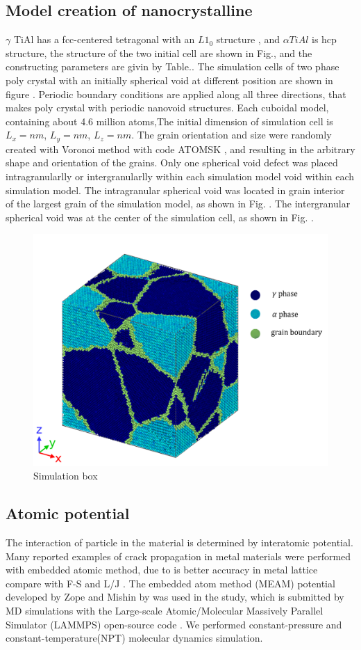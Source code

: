 \documentclass[final,5p,times,twocolumn]{elsarticle}
\begin{document}
\subsection{Model creation of nanocrystalline}
$\gamma $ TiAl has a fcc-centered tetragonal with an $L1_0$ structure \cite{}, and $\alpha TiAl$ is hcp structure, the structure of the two initial cell are shown in Fig.\cite{}, and the constructing parameters are givin by Table.\cite{}. The simulation cells of two phase poly crystal with an initially spherical void at different position are shown in figure \cite{}. Periodic boundary conditions are applied along all three directions, that makes poly crystal with periodic nanovoid structures. Each cuboidal model, containing about 4.6 million atoms,The initial dimension of simulation cell is  $L_x = nm$, $L_y =  nm$, $L_z =  nm$. The grain orientation and size were randomly created with Voronoi method with code ATOMSK \cite{}, and resulting in the arbitrary shape and orientation of the grains. Only one spherical void defect was placed intragranularlly or intergranularlly within each simulation model void within each simulation model. The intragranular spherical void was located in grain interior of the largest grain of the simulation model, as shown in Fig. \cite{}. The intergranular spherical void was at the center of the simulation cell, as shown in Fig. \cite{}.
\begin{figure}
	\centering
	\includegraphics[width=0.7\linewidth]{img/pf_model_labeled}
	\caption{Simulation box}

\end{figure}

\subsection{Atomic potential}
The interaction of particle in the material is determined by interatomic potential. Many reported examples of crack propagation in metal materials were performed with embedded atomic method, due to is better accuracy in metal lattice compare with F-S and L/J \cite{compare LJ and other}. The embedded atom method (MEAM) potential developed by Zope and Mishin by \cite{} was used in the study, which is submitted by MD simulations with the Large-scale Atomic/Molecular Massively Parallel Simulator (LAMMPS) open-source code \cite{}. We performed constant-pressure and constant-temperature(NPT) molecular dynamics simulation.
\end{document}
